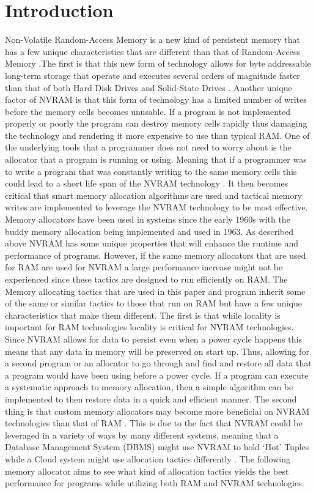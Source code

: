 \documentclass[conference]{IEEEtran}
\begin{document}
\section{Introduction}
Non-Volatile Random-Access Memory  is a new kind of persistent memory that has a few unique characteristics that are different than that of Random-Access Memory .The first is that this new form of technology allows for byte addressable long-term storage that operate and executes several orders of magnitude faster than that of both Hard Disk Drives  and Solid-State Drives \cite{Arulrajdbms}. Another unique factor of NVRAM is that this form of technology has a limited number of writes before the memory cells becomes unusable. If a program is not implemented properly or poorly the program can destroy memory cells rapidly thus damaging the technology and rendering it more expensive to use than typical RAM. One of the underlying tools that a programmer does not need to worry about is the allocator that a program is running or using.  Meaning that if a programmer was to write a program that was constantly writing to the same memory cells this could lead to a short life span of the NVRAM technology \cite{FullSysCrash}. It then becomes critical that smart memory allocation algorithms are used and tactical memory writes are implemented to leverage the NVRAM technology to be most effective. 
\\
Memory allocators have been used in systems since the early 1960s with the buddy memory allocation being implemented and used in 1963. As described above NVRAM has some unique properties that will enhance the runtime and performance of programs. However, if the same memory allocators that are used for RAM are used for NVRAM a large performance increase might not be experienced since these tactics are designed to run efficiently on RAM. The Memory allocating tactics that are used in this paper and program inherit some of the same or similar tactics to those that run on RAM but have a few unique characteristics that make them different. The first is that while locality is important for RAM technologies locality is critical for NVRAM technologies. Since NVRAM allows for data to persist even when a power cycle happens this means that any data in memory will be preserved on start up. Thus, allowing for a second program or an allocator to go through and find and restore all data that a program would have been using before a power cycle.  If a program can execute a systematic approach to memory allocation, then a simple algorithm can be implemented to then restore data in a quick and efficient manner. The second thing is that custom memory allocators may become more beneficial on NVRAM technologies than that of RAM \cite{berger-oopsla-2002}. This is due to the fact that NVRAM could be leveraged in a variety of ways by many different systems, meaning that a Database Management System (DBMS) might use NVRAM to hold ‘Hot’ Tuples while a Cloud system might use allocation tactics differently \cite{Arulrajdbms}.  The following memory allocator aims to see what kind of allocation tactics yields the best performance for programs while utilizing both RAM and NVRAM technologies. 
\end{document}
